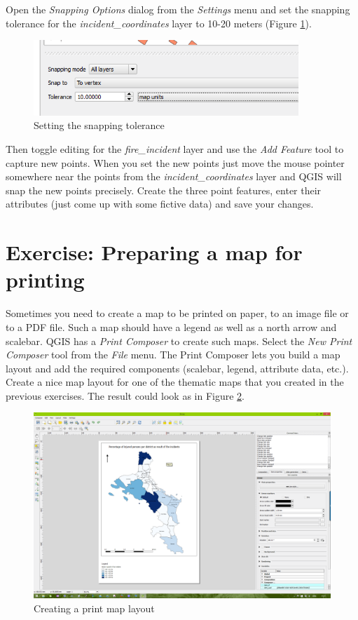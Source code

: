 \documentclass[a4paper,12pt,titlepage]{article}
\begin{document}
Open the \textit{Snapping Options} dialog from the \textit{Settings} menu and set the snapping tolerance for the \textit{incident\_coordinates} layer to 10-20 meters (Figure \ref{fig:snapping_tolerance}).

\begin{figure}[htb]
\centering
\includegraphics[width=10cm]{Images/snapping_tolerance.png}
\caption{Setting the snapping tolerance}\label{fig:snapping_tolerance}
\end{figure}

Then toggle editing for the \textit{fire\_incident} layer and use the \textit{Add Feature} tool to capture new points. When you set the new points just move the mouse pointer somewhere near the points from the \textit{incident\_coordinates} layer and QGIS will snap the new points precisely. Create the three point features, enter their attributes (just come up with some fictive data) and save your changes.

\section{Exercise: Preparing a map for printing}
Sometimes you need to create a map to be printed on paper, to an image file or to a PDF file. Such a map should have a legend as well as a north arrow and scalebar. QGIS has a \textit{Print Composer} to create such maps. Select the \textit{New Print Composer} tool from the \textit{File} menu. The Print Composer lets you build a map layout and add the required components (scalebar, legend, attribute data, etc.).
Create a nice map layout for one of the thematic maps that you created in the previous exercises. The result could look as in Figure \ref{fig:map_layout}.

\begin{figure}[htb]
\centering
\includegraphics[width=14cm]{Images/map_layout.png}
\caption{Creating a print map layout}\label{fig:map_layout}
\end{figure}
\end{document}
